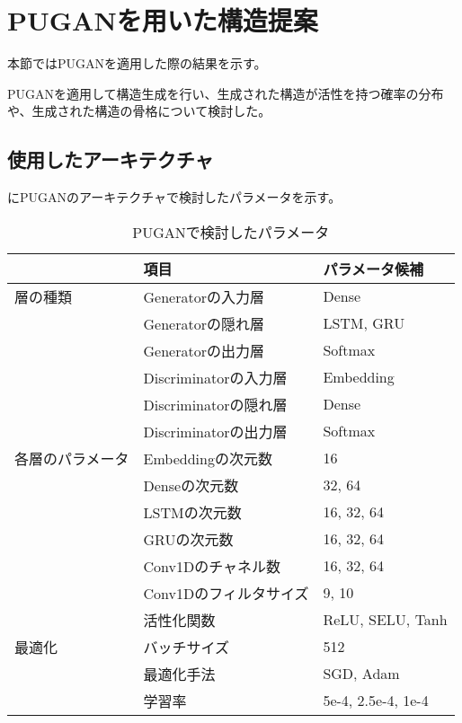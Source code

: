 \section{PUGANを用いた構造提案} \label{sec:result_pugan}

本節ではPUGANを適用した際の結果を示す。

PUGANを適用して構造生成を行い、生成された構造が活性を持つ確率の分布や、生成された構造の骨格について検討した。

\subsection{使用したアーキテクチャ}

にPUGANのアーキテクチャで検討したパラメータを示す。
\begin{table}[tbp]
\centering
\caption{PUGANで検討したパラメータ} \label{tb:pugan_parameter_search}
\begin{tabular}{lll}\hline
& 項目 & パラメータ候補 \\\hline
層の種類 & Generatorの入力層 & Dense \\
& Generatorの隠れ層 & LSTM, GRU \\
& Generatorの出力層 & Softmax \\
& Discriminatorの入力層 & Embedding \\
& Discriminatorの隠れ層 & Dense \\
& Discriminatorの出力層 & Softmax \\\hline
各層のパラメータ & Embeddingの次元数 & 16 \\
& Denseの次元数 & 32, 64 \\
& LSTMの次元数 & 16, 32, 64 \\
& GRUの次元数 & 16, 32, 64 \\
& Conv1Dのチャネル数 & 16, 32, 64 \\
& Conv1Dのフィルタサイズ & 9, 10 \\
& 活性化関数 & ReLU, SELU, Tanh \\\hline
最適化 & バッチサイズ & 512 \\
& 最適化手法 & SGD, Adam \\
& 学習率 & 5e-4, 2.5e-4, 1e-4 \\\hline
\end{tabular}
\end{table}

